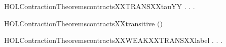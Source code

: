 \newcommand{\HOLContractionTheoremscontractsXXTRANSXXtau}{\UseVerbatim{HOLContractionTheoremscontractsXXTRANSXXtau}}
\begin{SaveVerbatim}{HOLContractionTheoremscontractsXXTRANSXXtauYY}
\HOLTokenTurnstile{} \HOLSymConst{\HOLTokenForall{}} .
          \HOLSymConst{\HOLTokenImp{}}
       \HOLSymConst{\HOLTokenForall{}}.  \HOLTokenTransBegin\HOLConst{\ensuremath{\tau}}\HOLTokenTransEnd {} \HOLSymConst{\HOLTokenImp{}} \HOLSymConst{\HOLTokenExists{}}.    \HOLSymConst{\HOLTokenConj{}}   
\end{SaveVerbatim}
\newcommand{\HOLContractionTheoremscontractsXXTRANSXXtauYY}{\UseVerbatim{HOLContractionTheoremscontractsXXTRANSXXtauYY}}
\begin{SaveVerbatim}{HOLContractionTheoremscontractsXXtransitive}
\HOLTokenTurnstile{}  \ensuremath{(}\ensuremath{)}
\end{SaveVerbatim}
\newcommand{\HOLContractionTheoremscontractsXXtransitive}{\UseVerbatim{HOLContractionTheoremscontractsXXtransitive}}
\begin{SaveVerbatim}{HOLContractionTheoremscontractsXXWEAKXXTRANSXXlabel}
\HOLTokenTurnstile{} \HOLSymConst{\HOLTokenForall{}} .
          \HOLSymConst{\HOLTokenImp{}}
       \HOLSymConst{\HOLTokenForall{}} .
            \HOLTokenWeakTransBegin{} \HOLTokenWeakTransEnd {} \HOLSymConst{\HOLTokenImp{}}
           \HOLSymConst{\HOLTokenExists{}}.  \HOLTokenWeakTransBegin{} \HOLTokenWeakTransEnd {} \HOLSymConst{\HOLTokenConj{}}   
\end{SaveVerbatim}
\newcommand{\HOLContractionTheoremscontractsXXWEAKXXTRANSXXlabel}{\UseVerbatim{HOLContractionTheoremscontractsXXWEAKXXTRANSXXlabel}}
